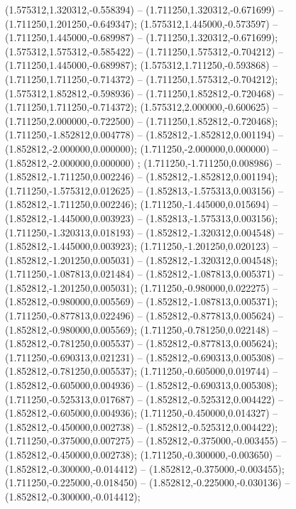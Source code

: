  (1.575312,1.320312,-0.558394) -- (1.711250,1.320312,-0.671699) -- (1.711250,1.201250,-0.649347);
 (1.575312,1.445000,-0.573597) -- (1.711250,1.445000,-0.689987) -- (1.711250,1.320312,-0.671699);
 (1.575312,1.575312,-0.585422) -- (1.711250,1.575312,-0.704212) -- (1.711250,1.445000,-0.689987);
 (1.575312,1.711250,-0.593868) -- (1.711250,1.711250,-0.714372) -- (1.711250,1.575312,-0.704212);
 (1.575312,1.852812,-0.598936) -- (1.711250,1.852812,-0.720468) -- (1.711250,1.711250,-0.714372);
 (1.575312,2.000000,-0.600625) -- (1.711250,2.000000,-0.722500) -- (1.711250,1.852812,-0.720468);
 (1.711250,-1.852812,0.004778) -- (1.852812,-1.852812,0.001194) -- (1.852812,-2.000000,0.000000);
 (1.711250,-2.000000,0.000000) -- (1.852812,-2.000000,0.000000) ;
 (1.711250,-1.711250,0.008986) -- (1.852812,-1.711250,0.002246) -- (1.852812,-1.852812,0.001194);
 (1.711250,-1.575312,0.012625) -- (1.852813,-1.575313,0.003156) -- (1.852812,-1.711250,0.002246);
 (1.711250,-1.445000,0.015694) -- (1.852812,-1.445000,0.003923) -- (1.852813,-1.575313,0.003156);
 (1.711250,-1.320313,0.018193) -- (1.852812,-1.320312,0.004548) -- (1.852812,-1.445000,0.003923);
 (1.711250,-1.201250,0.020123) -- (1.852812,-1.201250,0.005031) -- (1.852812,-1.320312,0.004548);
 (1.711250,-1.087813,0.021484) -- (1.852812,-1.087813,0.005371) -- (1.852812,-1.201250,0.005031);
 (1.711250,-0.980000,0.022275) -- (1.852812,-0.980000,0.005569) -- (1.852812,-1.087813,0.005371);
 (1.711250,-0.877813,0.022496) -- (1.852812,-0.877813,0.005624) -- (1.852812,-0.980000,0.005569);
 (1.711250,-0.781250,0.022148) -- (1.852812,-0.781250,0.005537) -- (1.852812,-0.877813,0.005624);
 (1.711250,-0.690313,0.021231) -- (1.852812,-0.690313,0.005308) -- (1.852812,-0.781250,0.005537);
 (1.711250,-0.605000,0.019744) -- (1.852812,-0.605000,0.004936) -- (1.852812,-0.690313,0.005308);
 (1.711250,-0.525313,0.017687) -- (1.852812,-0.525312,0.004422) -- (1.852812,-0.605000,0.004936);
 (1.711250,-0.450000,0.014327) -- (1.852812,-0.450000,0.002738) -- (1.852812,-0.525312,0.004422);
 (1.711250,-0.375000,0.007275) -- (1.852812,-0.375000,-0.003455) -- (1.852812,-0.450000,0.002738);
 (1.711250,-0.300000,-0.003650) -- (1.852812,-0.300000,-0.014412) -- (1.852812,-0.375000,-0.003455);
 (1.711250,-0.225000,-0.018450) -- (1.852812,-0.225000,-0.030136) -- (1.852812,-0.300000,-0.014412);
